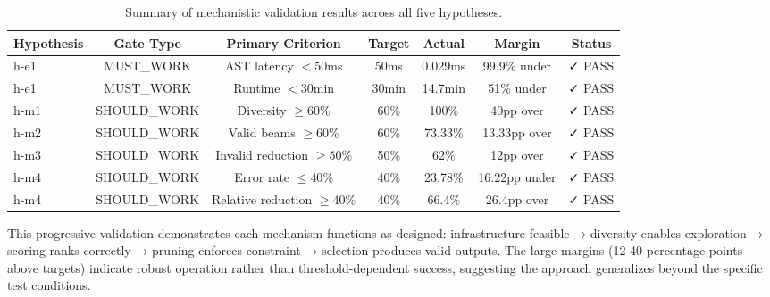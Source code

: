\begin{table}[h]
\centering
\caption{Summary of mechanistic validation results across all five hypotheses.}
\label{tab:mechanistic-summary}
\begin{tabular}{lcccccc}
\toprule
Hypothesis & Gate Type & Primary Criterion & Target & Actual & Margin & Status \\
\midrule
h-e1 & MUST\_WORK & AST latency $<50$ms & 50ms & 0.029ms & 99.9\% under & ✓ PASS \\
h-e1 & MUST\_WORK & Runtime $<30$min & 30min & 14.7min & 51\% under & ✓ PASS \\
h-m1 & SHOULD\_WORK & Diversity $\geq 60$\% & 60\% & 100\% & 40pp over & ✓ PASS \\
h-m2 & SHOULD\_WORK & Valid beams $\geq 60$\% & 60\% & 73.33\% & 13.33pp over & ✓ PASS \\
h-m3 & SHOULD\_WORK & Invalid reduction $\geq 50$\% & 50\% & 62\% & 12pp over & ✓ PASS \\
h-m4 & SHOULD\_WORK & Error rate $\leq 40$\% & 40\% & 23.78\% & 16.22pp under & ✓ PASS \\
h-m4 & SHOULD\_WORK & Relative reduction $\geq 40$\% & 40\% & 66.4\% & 26.4pp over & ✓ PASS \\
\bottomrule
\end{tabular}
\end{table}

This progressive validation demonstrates each mechanism functions as designed: infrastructure feasible → diversity enables exploration → scoring ranks correctly → pruning enforces constraint → selection produces valid outputs. The large margins (12-40 percentage points above targets) indicate robust operation rather than threshold-dependent success, suggesting the approach generalizes beyond the specific test conditions.
